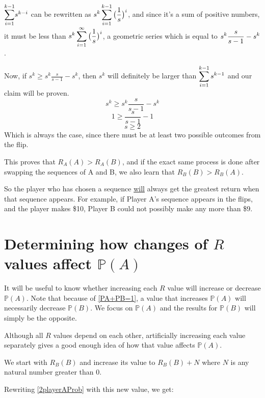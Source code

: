 \documentclass[english,12pt,a4paper,final]{article}
\begin{document}
$\mathlarger\sum_{i=1}^{k-1}s^{k-i}$ can be rewritten as
$\mathlarger{s^k \sum_{i=1}^{k-1}\big(\frac{1}{s}\big)^i}$, and since it's a sum of positive numbers, it must be less than $\mathlarger{s^k\sum_{i=1}^{\infty}\big(\frac{1}{s}\big)^i}$, a geometric series which is equal to $\mathlarger{s^k\frac{s}{s-1} - s^k}$.

Now, if $s^k \ge s^k\frac{s}{s-1} - s^k$, then $s^k$ will definitely be larger than $\mathlarger{\sum_{i=1}^{k-1}s^{k-1}}$ and our claim will be proven.
\\
\begin{equation*}
	s^k \ge s^k\frac{s}{s-1} - s^k
\end{equation*}
\begin{equation*}
	1 \ge \frac{s}{s-1} - 1
\end{equation*}
\begin{equation*}
	s \ge 2
\end{equation*}
Which is always the case, since there must be at least two possible outcomes from the flip.

This proves that ${R_A(A) > R_A(B)}$, and if the exact same process is done after swapping the sequences of A and B, we also learn that $R_B(B)>R_B(A)$.

So the player who has chosen a sequence \underline{will} always get the greatest return when that sequence appears. For example, if Player A's sequence appears in the flips, and the player makes \$10, Player B could not possibly make any more than \$9.

\section{Determining how changes of $R$ values affect $\mathbb{P}(A)$}

It will be useful to know whether increasing each $R$ value will increase or decrease $\mathbb{P}(A)$. Note that because of \eqref{PA+PB=1}, a value that increases $\mathbb{P}(A)$ will necessarily decrease $\mathbb{P}(B)$. We focus on $\mathbb{P}(A)$ and the results for $\mathbb{P}(B)$ will simply be the opposite.

Although all $R$ values depend on each other, artificially increasing each value separately gives a good enough idea of how that value affects $\mathbb{P}(A)$.

We start with $R_B(B)$ and increase its value to $R_B(B) + N$ where $N$ is any natural number greater than 0.

Rewriting \eqref{2playerAProb} with this new value, we get:
\end{document}
